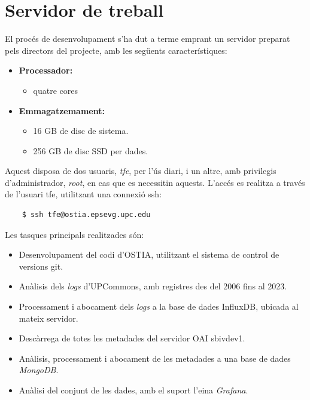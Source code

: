 \chapter{Servidor de treball}\label{ch:server-description}

El procés de desenvolupament s’ha dut a terme emprant un servidor preparat pels directors del projecte, amb les següents característiques:

\begin{itemize}
    \item \textbf{Processador:}
    \begin{itemize}
        \item quatre cores
    \end{itemize}
    \item \textbf{Emmagatzemament:}
    \begin{itemize}
        \item 16 GB de disc de sistema.
        \item 256 GB de disc SSD per dades.
    \end{itemize}
\end{itemize}

\noindent
Aquest disposa de dos usuaris, \textit{tfe}, per l’ús diari, i un altre, amb privilegis d’administrador, \textit{root}, en cas que es necessitin aquests.
L’accés es realitza a través de l’usuari tfe, utilitzant una connexió \gls{ssh}:

\begin{verbatim}
    $ ssh tfe@ostia.epsevg.upc.edu
\end{verbatim}

\noindent
Les tasques principals realitzades són:

\begin{itemize}
    \item Desenvolupament del codi d’\gls{OSTIA}, utilitzant el sistema de control de versions git.
    \item Anàlisis dels \textit{\gls{log}s} d’\gls{UPCommons}, amb registres des del 2006 fins al 2023.
    \item Processament i abocament dels \textit{\gls{log}s} a la base de dades InfluxDB, ubicada al mateix servidor.
    \item Descàrrega de totes les metadades del servidor \gls{OAI} sbivdev1.
    \item Anàlisis, processament i abocament de les metadades a una base de dades \textit{MongoDB}.
    \item Anàlisi del conjunt de les dades, amb el suport l’eina \textit{Grafana}.
\end{itemize}

